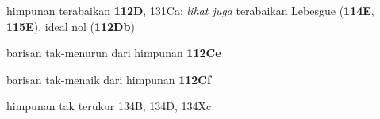 










himpunan terabaikan {\bf 112D}, 131Ca; 
  {\it lihat juga} 
terabaikan Lebesgue ({\bf 114E}, {\bf 115E}), ideal nol ({\bf 112Db})




































barisan tak-menurun dari himpunan {\bf 112Ce}

barisan tak-menaik dari himpunan {\bf 112Cf}

himpunan tak terukur 134B, 134D, 134Xc













































